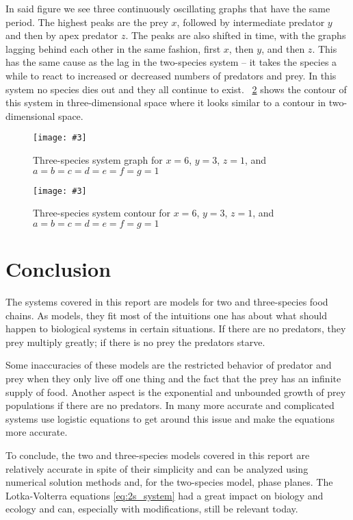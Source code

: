 \documentclass[12pt,a4paper,reqno]{amsart}
\newcommand{\figref}[1]{\textsc{\figurename}~\ref{#1}}
\newcommand{\makefig}[4]{
\begin{figure}[#1]
    \captionsetup{justification=centering}
    \texttt{[image: \#3]}
    \caption{#4}
    \label{fig:#3}
\end{figure}
}
\begin{document}
In said figure we see three continuously oscillating graphs that have the same
period. The highest peaks are the prey $x$, followed by intermediate predator
$y$ and then by apex predator $z$. The peaks are also shifted in time, with the
graphs lagging behind each other in the same fashion, first $x$, then $y$, and
then $z$. This has the same cause as the lag in the two-species system -- it
takes the species a while to react to increased or decreased numbers of
predators and prey. In this system no species dies out and they all continue to
exist. \figref{fig:3s_ga_eq_fb_contour} shows the contour of this system in
three-dimensional space where it looks similar to a contour in two-dimensional
space.
\makefig{h}{0.8\textwidth}{3s_ga_eq_fb_graph}{Three-species system graph for
$x=6$, $y=3$, $z=1$, and $a=b=c=d=e=f=g=1$}
\makefig{h}{0.5\textwidth}{3s_ga_eq_fb_contour}{Three-species system contour for
$x=6$, $y=3$, $z=1$, and $a=b=c=d=e=f=g=1$}


\section{Conclusion}
The systems covered in this report are models for two and three-species food
chains. As models, they fit most of the intuitions one has about what 
should happen to biological systems in certain situations. If there are no
predators, they prey multiply greatly; if there is no prey the predators
starve. 

Some inaccuracies of these models are the restricted behavior of predator and
prey when they only live off one thing and the fact that the prey has an
infinite supply of food. Another aspect is the exponential and unbounded growth
of prey populations if there are no predators. In many more accurate and
complicated systems use logistic equations to get around this issue and make
the equations more accurate. 

To conclude, the two and three-species models covered in this report are
relatively accurate in spite of their simplicity and can be analyzed using
numerical solution methods and, for the two-species model, phase planes. The
Lotka-Volterra equations \eqref{eq:2s_system} had a great impact on biology and
ecology \cite{wangersky} and can, especially with modifications, still be 
relevant today.



\end{document}

